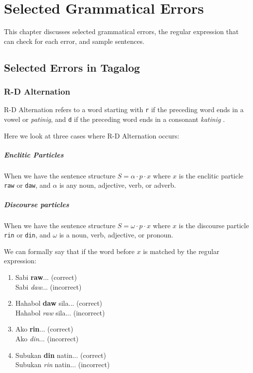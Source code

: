 \chapter{Selected Grammatical Errors}
This chapter discusses selected grammatical errors, the regular expression that can check for each error, and sample sentences.

\section{Selected Errors in Tagalog}
\subsection{R-D Alternation}
\label{rd_alternation}

R-D Alternation refers to a word starting with \texttt{r} if the preceding word ends in a vowel or \textit{patinig}, and \texttt{d} if the preceding word ends in a consonant \textit{katinig} \cite{KWF, OOP}. 

Here we look at three cases where R-D Alternation occurs:

\paragraph{Enclitic Particles} When we have the sentence structure \(S = \alpha \cdot p \cdot x\) where $x$ is the enclitic particle \texttt{raw} or \texttt{daw}, and \(\alpha\) is any noun, adjective, verb, or adverb. 

\paragraph{Discourse particles} When we have the sentence structure $S = \omega \cdot p \cdot x$ where $x$ is the discourse particle \texttt{rin} or \texttt{din}, and $\omega$ is a noun, verb, adjective, or pronoun.

We can formally say that if the word before $x$ is matched by the regular expression:

\begin{example}
\end{example}

\begin{enumerate}
    \item Sabi \textbf{raw}... (correct)
        \\ Sabi \textit{daw}... (incorrect)
    \item Hahabol \textbf{daw} sila... (correct)
        \\ Hahabol \textit{raw} sila... (incorrect)
    \item Ako \textbf{rin}... (correct)
        \\ Ako \textit{din}... (incorrect)
    \item Subukan \textbf{din} natin... (correct)
        \\ Subukan \textit{rin} natin... (incorrect)
\end{enumerate}

